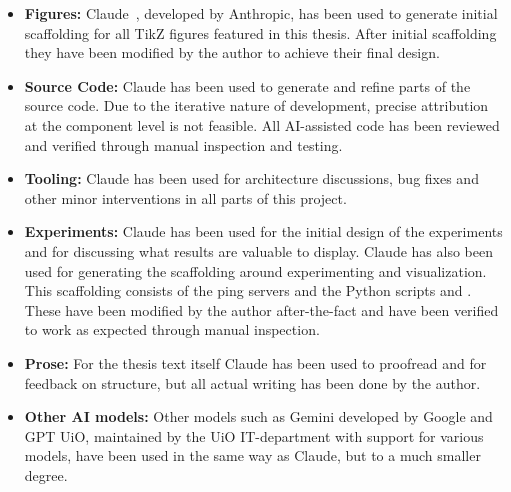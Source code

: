 \begin{itemize}
    \item \textbf{Figures:} Claude~\cite{claude}, developed by Anthropic, has been used to generate initial scaffolding for all TikZ figures
        featured in this thesis. After initial scaffolding they have
        been modified by the author to achieve their final design.
    \item \textbf{Source Code:} Claude has been used to generate and refine parts of
      the source code. Due to the iterative nature of development, precise attribution
      at the component level is not feasible. All AI-assisted code has been reviewed
      and verified through manual inspection and testing.
    \item \textbf{Tooling:} Claude has been used for
      architecture discussions, bug fixes and other minor interventions in all
      parts of this project.
    \item \textbf{Experiments:}
      Claude has been used for the initial design of
      the experiments and for discussing what results are valuable to display.
      Claude has also been used for generating the scaffolding around experimenting 
      and visualization. This scaffolding consists of
      the ping servers and the Python scripts  and
      . These have been modified by the author after-the-fact
      and have been verified to work as expected through manual inspection.
    \item \textbf{Prose:} For the thesis text itself Claude has been
      used to proofread and for feedback on structure, but all
      actual writing has been done by the author.
    \item \textbf{Other AI models:} Other models such as Gemini \cite{gemini} developed by Google and GPT UiO, maintained
      by the UiO IT-department with support for various models, have been used in the
      same way as Claude, but to a much smaller degree.
\end{itemize}
